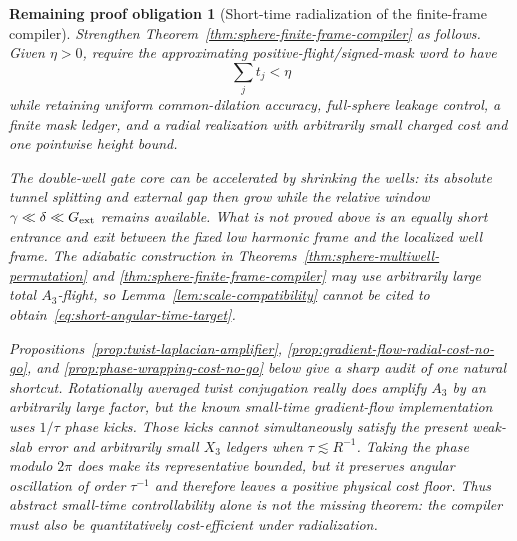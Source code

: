 \documentclass[11pt]{article}
\newtheorem{problem}[theorem]{Remaining proof obligation}
\theoremstyle{remark}
\begin{document}
\begin{problem}[Short-time radialization of the finite-frame compiler]
\label{prob:short-time-radial-compiler}
Strengthen Theorem~\ref{thm:sphere-finite-frame-compiler} as follows.  Given
$\eta>0$, require the approximating positive-flight/signed-mask word to have
\begin{equation}
 \sum_jt_j<\eta
 \label{eq:short-angular-time-target}
\end{equation}
while retaining uniform common-dilation accuracy, full-sphere leakage
control, a finite mask ledger, and a radial realization with arbitrarily
small charged cost and one pointwise height bound.

The double-well gate core can be accelerated by shrinking the wells: its
absolute tunnel splitting and external gap then grow while the relative
window $\gamma\ll\delta\ll G_{\rm ext}$ remains available.  What is not
proved above is an equally short entrance and exit between the fixed low
harmonic frame and the localized well frame.  The adiabatic construction in
Theorems~\ref{thm:sphere-multiwell-permutation} and
\ref{thm:sphere-finite-frame-compiler} may use arbitrarily large total
$A_3$-flight, so Lemma~\ref{lem:scale-compatibility} cannot be cited to
obtain~\eqref{eq:short-angular-time-target}.

Propositions~\ref{prop:twist-laplacian-amplifier},
\ref{prop:gradient-flow-radial-cost-no-go}, and
\ref{prop:phase-wrapping-cost-no-go} below give a sharp audit of one
natural shortcut.  Rotationally averaged twist conjugation really does
amplify $A_3$ by an arbitrarily large factor, but the known small-time
gradient-flow implementation uses $1/\tau$ phase kicks.  Those kicks cannot
simultaneously satisfy the present weak-slab error and arbitrarily small
$X_3$ ledgers when $\tau\lesssim R^{-1}$.  Taking the phase modulo $2\pi$
does make its representative bounded, but it preserves angular oscillation
of order $\tau^{-1}$ and therefore leaves a positive physical cost floor.
Thus abstract small-time controllability alone is not the missing theorem:
the compiler must also be quantitatively cost-efficient under radialization.


\end{problem}
\end{document}
